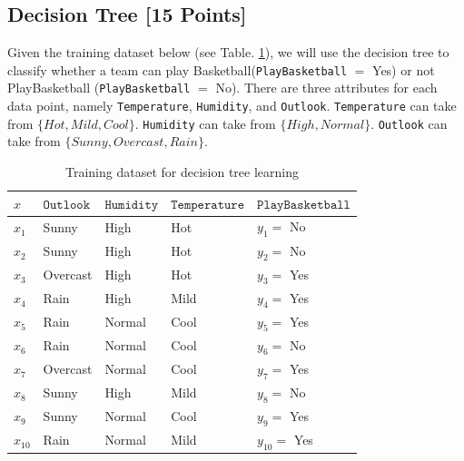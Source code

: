 \documentclass{homework}
\begin{document}
\newpage

\subsection{Decision Tree [15 Points]}
Given the training dataset below (see Table. \ref{table:decision_tree_train_data}), we will use the decision tree to classify whether a team can play Basketball(\texttt{PlayBasketball} $=$ Yes) or  not  PlayBasketball (\texttt{PlayBasketball} $=$ No). There are three attributes for each data point, namely \texttt{Temperature}, \texttt{Humidity}, and \texttt{Outlook}. \texttt{Temperature} can take from $\{Hot, Mild, Cool\}$. \texttt{Humidity} can take from $\{High, Normal\}$. \texttt{Outlook} can take from $\{Sunny, Overcast, Rain\}$.

\begin{table}[h]
\centering
\begin{tabular}{|l|l|l|l|l|}
\hline
$x$ &  $\texttt{Outlook}$&$\texttt{Humidity}$& $\texttt{Temperature}$& $\texttt{PlayBasketball}$\\
\hline
$x_1$ &  Sunny&High& Hot& $y_1=$ No\\
\hline
$x_2$ &  Sunny&High& Hot& $y_2=$ No \\
\hline
$x_3$ &  Overcast&High& Hot& $y_3=$ Yes \\
\hline
$x_4$ &  Rain&High& Mild& $y_4=$ Yes\\
\hline
$x_5$ &  Rain&Normal& Cool& $y_5=$ Yes\\
\hline
$x_6$ &  Rain&Normal& Cool& $y_6=$ No\\
\hline
$x_7$ &  Overcast&Normal& Cool& $y_7=$ Yes \\
\hline
$x_8$ &  Sunny&High& Mild& $y_8=$ No \\
\hline
$x_9$ &  Sunny&Normal& Cool& $y_9=$ Yes\\
\hline
$x_{10}$ &  Rain&Normal& Mild& $y_{10}=$ Yes \\
\hline
\end{tabular}
\caption{Training dataset for decision tree learning}
\label{table:decision_tree_train_data}
\end{table}
 \vspace{200px}
\end{document}
